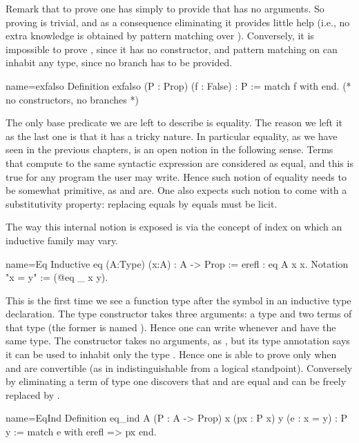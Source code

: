 Remark that to prove  one has simply to provide  that has no
arguments.  So proving  is trivial, and as a consequence eliminating it
provides little help (i.e., no extra knowledge is obtained by pattern matching
over ).  Conversely, it is impossible to prove , since it has no
constructor, and pattern matching on  can inhabit any type, since no
branch has to be provided.

\begin{coq}{name=exfalso}{}
Definition exfalso (P : Prop) (f : False) : P :=
  match f with end.  (* no constructors, no branches *)
\end{coq}

The only base predicate we are left to describe is equality.  The reason we
left it as the last one is that it has a tricky nature.  In particular
equality, as we have seen in the previous chapters, is an open notion
in the following sense.  Terms that compute to the same syntactic expression
are considered as equal, and this is true for any program the user may write.
Hence such notion of equality needs to be somewhat primitive, as
 and  are.  One also expects such notion to come
with a substitutivity property: replacing equals by equals must be licit.

The way this internal notion is exposed is via the concept of index
on which an inductive family may vary.

\begin{coq}{name=Eq}{}
Inductive eq (A:Type) (x:A) : A -> Prop := erefl : eq A x x.
Notation "x = y" := (@eq _ x y).
\end{coq}

This is the first time we see a function type after the \C{:} symbol
in an inductive type declaration.
The  type constructor takes three arguments: a type  and
two terms of that type (the former is named ).
Hence one can write  whenever  and 
have the same type.
The  constructor takes no arguments, as , but its type
annotation says it can be used to inhabit only the type .
Hence one is able to prove  only when  and  are
convertible
(as in indistinguishable from a logical standpoint).
Conversely by eliminating a term
of type  one discovers that   and  are
equal and  can be freely replaced by .

\begin{coq}{name=EqInd}{}
Definition eq_ind A (P : A -> Prop) x (px : P x) y (e : x = y) : P y :=
  match e with erefl => px end.
\end{coq}

